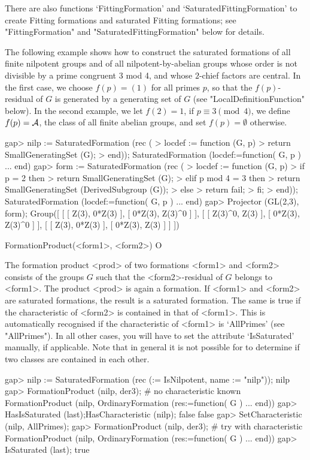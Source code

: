 There are also functions `FittingFormation' and `SaturatedFittingFormation'
to create Fitting
formations and saturated Fitting formations; see
 "FittingFormation" and "SaturatedFittingFormation" below for details. 

The following example shows how to construct the saturated formations of
all finite nilpotent groups and of
all nilpotent-by-abelian groups whose order is not divisible by a
prime congruent 3 mod 4, and whose $2$-chief factors are central. In the first case, we choose
$f(p) = (1)$ for all primes $p$, so that the $f(p)$-residual of $G$ is generated by a
generating set of $G$ (see "LocalDefinitionFunction" below). In the second example, we let 
$f(2) = 1$, if $p \equiv 3
\pmod 4$, we define $f(p) = {\cal A}$, the class of all finite abelian groups, and set $f(p) =
\emptyset$ otherwise.

\beginexample
gap> nilp := SaturatedFormation (rec (
>      locdef := function (G, p)
>          return SmallGeneratingSet (G);
>      end));
SaturatedFormation (locdef:=function( G, p ) ... end)
gap> form := SaturatedFormation (rec (
>    locdef := function (G, p)
>        if p = 2 then
>           return SmallGeneratingSet (G);
>        elif p mod 4 = 3 then
>           return SmallGeneratingSet (DerivedSubgroup (G));
>        else
>           return fail;
>        fi;
>     end));
SaturatedFormation (locdef:=function( G, p ) ... end)
gap> Projector (GL(2,3), form);
Group([ [ [ Z(3), 0*Z(3) ], [ 0*Z(3), Z(3)^0 ] ], 
  [ [ Z(3)^0, Z(3) ], [ 0*Z(3), Z(3)^0 ] ], 
  [ [ Z(3), 0*Z(3) ], [ 0*Z(3), Z(3) ] ] ])
\endexample

\>FormationProduct(<form1>, <form2>) O

The formation product <prod> of two formations <form1> and <form2> 
consists  of the groups $G$ such that the <form2>-residual of $G$ belongs to
<form1>. The product <prod> is again a formation. If <form1>
and <form2> are saturated formations, the result is a saturated
formation. The same is true if the characteristic of <form2> is contained in
that of <form1>. This is automatically recognised if the characteristic of
<form1> is `AllPrimes' (see "AllPrimes"). In all other cases, you
will have to set the attribute `IsSaturated' manually, if applicable. Note
that in general it is not possible for {\CRISP} to determine if two classes
are contained in each other.

\beginexample
gap> nilp := SaturatedFormation (rec (\in := IsNilpotent, name := "nilp"));
nilp
gap> FormationProduct (nilp, der3); # no characteristic known
FormationProduct (nilp, OrdinaryFormation (res:=function( G ) ... end))
gap> HasIsSaturated (last);HasCharacteristic (nilp);
false
false
gap> SetCharacteristic (nilp, AllPrimes);
gap> FormationProduct (nilp, der3); # try with characteristic
FormationProduct (nilp, OrdinaryFormation (res:=function( G ) ... end))
gap> IsSaturated (last);
true
\endexample


